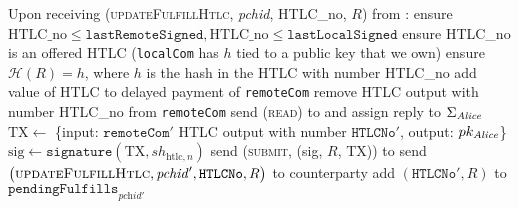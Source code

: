 \begin{algorithmic}[1]
    \State Upon receiving (\textsc{updateFulfillHtlc}, \textit{pchid}, HTLC\_no,
    $R$) from \bob:
    \Indent
      \State ensure $\mathrm{HTLC\_no} \leq \mathtt{lastRemoteSigned},
      \mathrm{HTLC\_no} \leq \mathtt{lastLocalSigned}$
      \State ensure HTLC\_no is an offered HTLC (\texttt{localCom} has $h$ tied
      to a public key that we own)
      \State ensure $\mathcal{H}\left(R\right) = h$, where $h$ is the hash in
      the HTLC with number HTLC\_no
      \State add value of HTLC to delayed payment of \texttt{remoteCom}
      \State remove HTLC output with number HTLC\_no from \texttt{remoteCom}
       
         
          \State send (\textsc{read}) to \ledger{} and assign reply to
          $\Sigma_{\mathit{Alice}}$
            \State $\mathrm{TX} \gets$ \{input: $\mathtt{remoteCom}'$ HTLC
            output with number $\mathtt{HTLCNo}'$, output: $pk_{\mathit{Alice}}$\}
            \State $\mathrm{sig} \gets \mathtt{signature}\left(\mathrm{TX},
            sh_{\mathrm{htlc}, n}\right)$
            \State send (\textsc{submit}, (sig, $R$, TX)) to \ledger{}
          \Else {}
            \State send $\left(\textsc{updateFulfillHtlc}, \mathit{pchid}',
            \mathtt{HTLCNo}, R\right)$ to counterparty
          \EndIf
        \Else {}
          \State add $\left(\mathtt{HTLCNo}', R\right)$ to
          $\mathtt{pendingFulfills}_{\textit{pchid}'}$ 
        \EndIf
      \EndIf
    \EndIndent
    \State


\end{algorithmic}
